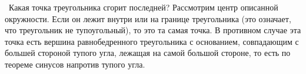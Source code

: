 \indent\indent\ Какая точка треугольника сгорит последней?
Рассмотрим центр описанной окружности. Если он лежит внутри
или на границе треугольника (это означает, что треугольник
не тупоугольный), то это та самая точка.
В противном случае эта точка есть вершина равнобедренного
треугольника с основанием, совпадающим с большей стороной
тупого угла, лежащая на самой большой стороне, то есть по теореме
синусов напротив тупого угла.
